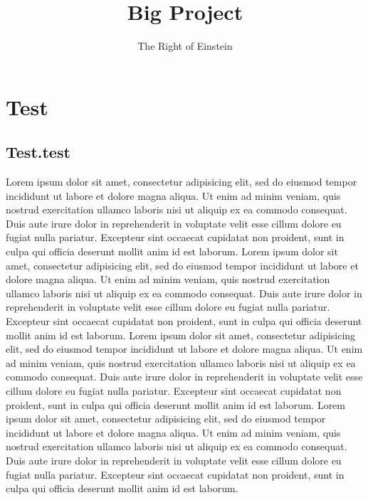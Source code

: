 \documentclass[a4paper, twoside]{article}
\title{Big Project}
\author{The Right of Einstein}
\begin{document}
  \pagestyle{mainstyle}
  \maketitle
  \tableofcontents
  \listoffigures
  \listoftables
  
  
  
  

  \section{Test}
  \subsection{Test.test}
    Lorem ipsum dolor sit amet, consectetur adipisicing elit, sed do eiusmod
    tempor incididunt ut labore et dolore magna aliqua. Ut enim ad minim veniam,
    quis nostrud exercitation ullamco laboris nisi ut aliquip ex ea commodo
    consequat. Duis aute irure dolor in reprehenderit in voluptate velit esse
    cillum dolore eu fugiat nulla pariatur. Excepteur sint occaecat cupidatat non
    proident, sunt in culpa qui officia deserunt mollit anim id est laborum.
    Lorem ipsum dolor sit amet, consectetur adipisicing elit, sed do eiusmod
    tempor incididunt ut labore et dolore magna aliqua. Ut enim ad minim veniam,
    quis nostrud exercitation ullamco laboris nisi ut aliquip ex ea commodo
    consequat. Duis aute irure dolor in reprehenderit in voluptate velit esse
    cillum dolore eu fugiat nulla pariatur. Excepteur sint occaecat cupidatat non
    proident, sunt in culpa qui officia deserunt mollit anim id est laborum.
    Lorem ipsum dolor sit amet, consectetur adipisicing elit, sed do eiusmod
    tempor incididunt ut labore et dolore magna aliqua. Ut enim ad minim veniam,
    quis nostrud exercitation ullamco laboris nisi ut aliquip ex ea commodo
    consequat. Duis aute irure dolor in reprehenderit in voluptate velit esse
    cillum dolore eu fugiat nulla pariatur. Excepteur sint occaecat cupidatat non
    proident, sunt in culpa qui officia deserunt mollit anim id est laborum.
    Lorem ipsum dolor sit amet, consectetur adipisicing elit, sed do eiusmod
    tempor incididunt ut labore et dolore magna aliqua. Ut enim ad minim veniam,
    quis nostrud exercitation ullamco laboris nisi ut aliquip ex ea commodo
    consequat. Duis aute irure dolor in reprehenderit in voluptate velit esse
    cillum dolore eu fugiat nulla pariatur. Excepteur sint occaecat cupidatat non
    proident, sunt in culpa qui officia deserunt mollit anim id est laborum.
\end{document}
